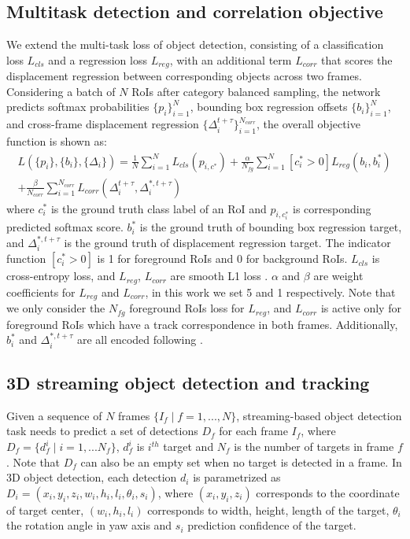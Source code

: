 \documentclass{bmvc2k}
\begin{document}
\subsection{Multitask detection and correlation objective}
We extend the multi-task loss of object detection, consisting of a classification loss $L_{cls}$ and a regression loss $L_{reg}$, with an additional term $L_{corr}$ that scores the displacement regression between corresponding objects across two frames. Considering a batch of $N$ RoIs after category balanced sampling, the network predicts softmax probabilities $\{p_i\}^N_{i=1}$, bounding box regression offsets $\{b_i\}^N_{i=1}$, and cross-frame displacement regression $\{\Delta^{t+\tau}_i\}^{N_{corr}}_{i=1}$, the overall objective function is shown as:
\begin{equation}
\begin{split}
L(\{p_i\}, \{b_i\}, \{\Delta_i\}) = \frac{1}{N} \sum^N_{i=1} L_{cls}(p_{i, c^*}) 
+ \frac{\alpha}{N_{fg}}\sum^N_{i=1} [c^*_i > 0]L_{reg}(b_i, b^*_i) \\
+ \frac{\beta}{N_{corr}} \sum^{N_{corr}}_{i=1}L_{corr}(\Delta^{t+\tau}_i, \Delta^{*, t+\tau}_i)
\end{split}
\end{equation}
where $c^*_i$ is the ground truth class label of an RoI and $p_{i, c^*_i}$ is corresponding predicted softmax score. $b^*_i$ is the ground truth of bounding box regression target, and $\Delta^{*, t+\tau}_i$ is the ground truth of displacement regression target. The indicator function $ [c^*_i > 0]$ is 1 for foreground RoIs and 0 for background RoIs. $L_{cls}$ is cross-entropy loss, and $L_{reg}$, $L_{corr}$ are smooth L1 loss \cite{girshick2015fast}. $\alpha$ and $\beta$ are weight coefficients for $L_{reg}$ and $L_{corr}$, in this work we set 5 and 1 respectively. Note that we only consider the $N_{fg}$ foreground RoIs loss for $L_{reg}$, and $L_{corr}$ is active only for foreground RoIs which have a track correspondence in both frames. Additionally, $b^*_i$ and $ \Delta^{*, t+\tau}_i$ are all encoded following \cite{ku2018joint}.

\subsection{3D streaming object detection and tracking}
Given a sequence of $N$ frames $\{I_f \mid f = 1, ..., N\}$, streaming-based object detection task needs to predict a set of detections $D_f$ for each frame $I_f$, where $D_f = \{d^i_f \mid i = 1,...N_f\}$, $d^i_f$ is $i^{th}$ target and $N_f$ is the number of targets in frame $f$. Note that $D_f$ can also be an empty set when no target is detected in a frame. In 3D object detection, each detection $d_i$ is parametrized as $D_i = (x_i, y_i, z_i, w_i, h_i, l_i, \theta_i, s_i)$, where $(x_i, y_i, z_i)$ corresponds to the coordinate of target center, $(w_i, h_i, l_i)$ corresponds to width, height, length of the target, $\theta_i$ the rotation angle in yaw axis and $s_i$ prediction confidence of the target.
\end{document}

